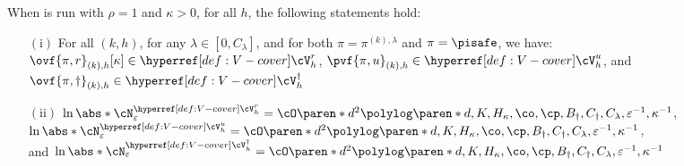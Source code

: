 \begin{lemma}[$V$ covers]\label{lemma:V-cover}
When  is run with $\rho =1$ and $\kappa > 0$, for all $h$, the following statements hold:
\begin{itemize}
\item[$(\mathrm{i})$] 
For all $(k, h)$, for any $\lambda \in [0, C_\lambda]$, and for both $\pi=\pi^{(k),\lambda}$ and $\pi=\pisafe$, we have:\\
\(\ovf{\pi, r}_{(k), h}[\kappa] \in \cVr_h\),
\(\pvf{\pi, u}_{(k), h} \in \cVu_h\),
and \(\ovf{\pi, \dagger}_{(k), h} \in \cVc_h\)  
\item[$(\mathrm{ii})$]
\(\ln \abs*{\cN^{\cVr_h}_{\varepsilon}} =
\cO\paren*{d^2} \polylog\paren*{d, K, H_\kappa, \co, \cp, B_\dagger, C_\dagger,C_\lambda,\varepsilon^{-1}, \kappa^{-1}}
\),\\
\(\ln \abs*{\cN^{\cVu_h}_{\varepsilon}} =
\cO\paren*{d^2} \polylog\paren*{d, K, H_\kappa, \co, \cp, B_\dagger, C_\dagger,C_\lambda,\varepsilon^{-1}, \kappa^{-1}}
\),\\
and \(\ln \abs*{\cN^{\cVc_h}_{\varepsilon}} =
\cO\paren*{d^2} \polylog\paren*{d, K, H_\kappa, \co, \cp, B_\dagger, C_\dagger,C_\lambda,\varepsilon^{-1}, \kappa^{-1}}
\)
\end{itemize}
\end{lemma}
